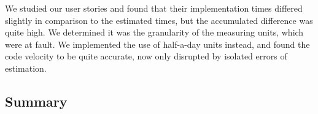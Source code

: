 We studied our user stories and found that their implementation times differed slightly in comparison to the estimated times, but the accumulated difference was quite high.
We determined it was the granularity of the measuring units, which were at fault.
We implemented the use of half-a-day units instead, and found the code velocity to be quite accurate, now only disrupted by isolated errors of estimation.

\subsection{Summary}
